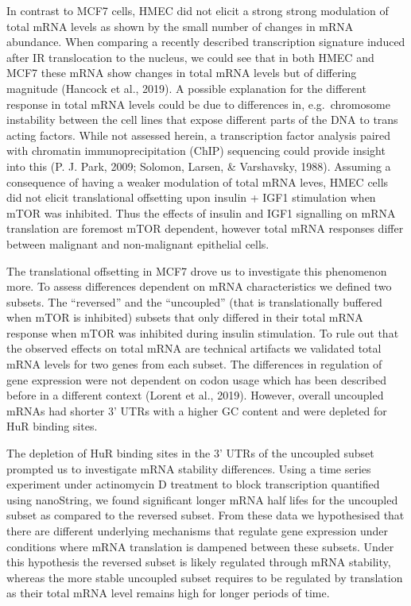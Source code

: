 \documentclass[12pt,openany]{book}
\begin{document}
In contrast to MCF7 cells, HMEC did not elicit a strong strong
modulation of total mRNA levels as shown by the small number of changes
in mRNA abundance. When comparing a recently described transcription
signature induced after IR translocation to the nucleus, we could see
that in both HMEC and MCF7 these mRNA show changes in total mRNA levels
but of differing magnitude (Hancock et al., 2019). A possible
explanation for the different response in total mRNA levels could be due
to differences in, e.g.~chromosome instability between the cell lines
that expose different parts of the DNA to trans acting factors. While
not assessed herein, a transcription factor analysis paired with
chromatin immunoprecipitation (ChIP) sequencing could provide insight
into this (P. J. Park, 2009; Solomon, Larsen, \& Varshavsky, 1988).
Assuming a consequence of having a weaker modulation of total mRNA
leves, HMEC cells did not elicit translational offsetting upon insulin +
IGF1 stimulation when mTOR was inhibited. Thus the effects of insulin
and IGF1 signalling on mRNA translation are foremost mTOR dependent,
however total mRNA responses differ between malignant and non-malignant
epithelial cells.

The translational offsetting in MCF7 drove us to investigate this
phenomenon more. To assess differences dependent on mRNA characteristics
we defined two subsets. The ``reversed'' and the ``uncoupled'' (that is
translationally buffered when mTOR is inhibited) subsets that only
differed in their total mRNA response when mTOR was inhibited during
insulin stimulation. To rule out that the observed effects on total mRNA
are technical artifacts we validated total mRNA levels for two genes
from each subset. The differences in regulation of gene expression were
not dependent on codon usage which has been described before in a
different context (Lorent et al., 2019). However, overall uncoupled
mRNAs had shorter 3' UTRs with a higher GC content and were depleted for
HuR binding sites.

The depletion of HuR binding sites in the 3' UTRs of the uncoupled
subset prompted us to investigate mRNA stability differences. Using a
time series experiment under actinomycin D treatment to block
transcription quantified using nanoString, we found significant longer
mRNA half lifes for the uncoupled subset as compared to the reversed
subset. From these data we hypothesised that there are different
underlying mechanisms that regulate gene expression under conditions
where mRNA translation is dampened between these subsets. Under this
hypothesis the reversed subset is likely regulated through mRNA
stability, whereas the more stable uncoupled subset requires to be
regulated by translation as their total mRNA level remains high for
longer periods of time.
\end{document}
